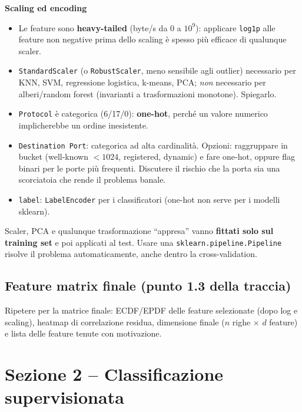 \begin{strategia}
\textbf{Scaling ed encoding}
\begin{itemize}
  \item Le feature sono \textbf{heavy-tailed} (byte/s da 0 a $10^9$): applicare
        \texttt{log1p} alle feature non negative prima dello scaling è spesso
        più efficace di qualunque scaler.
  \item \texttt{StandardScaler} (o \texttt{RobustScaler}, meno sensibile agli
        outlier) necessario per KNN, SVM, regressione logistica, k-means, PCA;
        \emph{non} necessario per alberi/random forest (invarianti a
        trasformazioni monotone). Spiegarlo.
  \item \texttt{Protocol} è categorica (6/17/0): \textbf{one-hot}, perché un
        valore numerico implicherebbe un ordine inesistente.
  \item \texttt{Destination Port}: categorica ad alta cardinalità. Opzioni:
        raggruppare in bucket (well-known $<1024$, registered, dynamic) e
        fare one-hot, oppure flag binari per le porte più frequenti. Discutere
        il rischio che la porta sia una scorciatoia che rende il problema
        banale.
  \item \texttt{label}: \texttt{LabelEncoder} per i classificatori
        (one-hot non serve per i modelli sklearn).
\end{itemize}
\end{strategia}

\begin{attenzione}
Scaler, PCA e qualunque trasformazione ``appresa'' vanno \textbf{fittati solo
sul training set} e poi applicati al test. Usare una \texttt{sklearn.pipeline.Pipeline}
risolve il problema automaticamente, anche dentro la cross-validation.
\end{attenzione}

\subsection{Feature matrix finale (punto 1.3 della traccia)}
Ripetere per la matrice finale: ECDF/EPDF delle feature selezionate (dopo log e
scaling), heatmap di correlazione residua, dimensione finale ($n$ righe
$\times$ $d$ feature) e lista delle feature tenute con motivazione.

\section{Sezione 2 -- Classificazione supervisionata}

